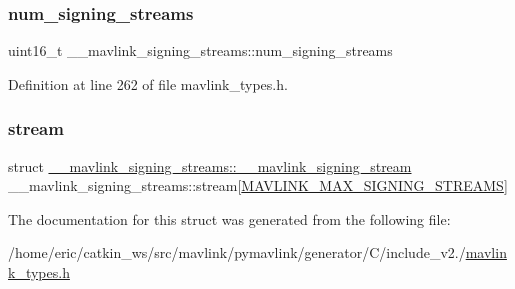 \subsubsection{\texorpdfstring{num\_signing\_streams}{num\_signing\_streams}}
{\footnotesize\ttfamily uint16\+\_\+t \+\_\+\+\_\+mavlink\+\_\+signing\+\_\+streams\+::num\+\_\+signing\+\_\+streams}



Definition at line 262 of file mavlink\+\_\+types.\+h.

\mbox{\label{struct____mavlink__signing__streams_a76b029e55c2ea2d8a90b7dd1c4776ffb}} 
\subsubsection{\texorpdfstring{stream}{stream}}
{\footnotesize\ttfamily struct \mbox{\hyperlink{struct____mavlink__signing__streams_1_1____mavlink__signing__stream}{\+\_\+\+\_\+mavlink\+\_\+signing\+\_\+streams\+::\+\_\+\+\_\+mavlink\+\_\+signing\+\_\+stream}}  \+\_\+\+\_\+mavlink\+\_\+signing\+\_\+streams\+::stream\mbox{[}\mbox{\hyperlink{include__v2_80_2mavlink__types_8h_aa50fb9588340e4be3b9c17e95494282c}{M\+A\+V\+L\+I\+N\+K\+\_\+\+M\+A\+X\+\_\+\+S\+I\+G\+N\+I\+N\+G\+\_\+\+S\+T\+R\+E\+A\+MS}}\mbox{]}}



The documentation for this struct was generated from the following file\+:\begin{DoxyCompactItemize}
\item 
/home/eric/catkin\+\_\+ws/src/mavlink/pymavlink/generator/\+C/include\+\_\+v2./\mbox{\hyperlink{include__v2_80_2mavlink__types_8h}{mavlink\+\_\+types.\+h}}\end{DoxyCompactItemize}
